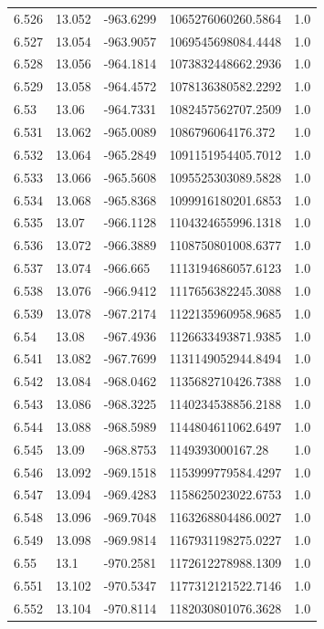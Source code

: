 \begin{tabular}{lllll}
6.526 & 13.052 & -963.6299 & 1065276060260.5864 & 1.0 \\
6.527 & 13.054 & -963.9057 & 1069545698084.4448 & 1.0 \\
6.528 & 13.056 & -964.1814 & 1073832448662.2936 & 1.0 \\
6.529 & 13.058 & -964.4572 & 1078136380582.2292 & 1.0 \\
6.53 & 13.06 & -964.7331 & 1082457562707.2509 & 1.0 \\
6.531 & 13.062 & -965.0089 & 1086796064176.372 & 1.0 \\
6.532 & 13.064 & -965.2849 & 1091151954405.7012 & 1.0 \\
6.533 & 13.066 & -965.5608 & 1095525303089.5828 & 1.0 \\
6.534 & 13.068 & -965.8368 & 1099916180201.6853 & 1.0 \\
6.535 & 13.07 & -966.1128 & 1104324655996.1318 & 1.0 \\
6.536 & 13.072 & -966.3889 & 1108750801008.6377 & 1.0 \\
6.537 & 13.074 & -966.665 & 1113194686057.6123 & 1.0 \\
6.538 & 13.076 & -966.9412 & 1117656382245.3088 & 1.0 \\
6.539 & 13.078 & -967.2174 & 1122135960958.9685 & 1.0 \\
6.54 & 13.08 & -967.4936 & 1126633493871.9385 & 1.0 \\
6.541 & 13.082 & -967.7699 & 1131149052944.8494 & 1.0 \\
6.542 & 13.084 & -968.0462 & 1135682710426.7388 & 1.0 \\
6.543 & 13.086 & -968.3225 & 1140234538856.2188 & 1.0 \\
6.544 & 13.088 & -968.5989 & 1144804611062.6497 & 1.0 \\
6.545 & 13.09 & -968.8753 & 1149393000167.28 & 1.0 \\
6.546 & 13.092 & -969.1518 & 1153999779584.4297 & 1.0 \\
6.547 & 13.094 & -969.4283 & 1158625023022.6753 & 1.0 \\
6.548 & 13.096 & -969.7048 & 1163268804486.0027 & 1.0 \\
6.549 & 13.098 & -969.9814 & 1167931198275.0227 & 1.0 \\
6.55 & 13.1 & -970.2581 & 1172612278988.1309 & 1.0 \\
6.551 & 13.102 & -970.5347 & 1177312121522.7146 & 1.0 \\
6.552 & 13.104 & -970.8114 & 1182030801076.3628 & 1.0 \\

\end{tabular}
